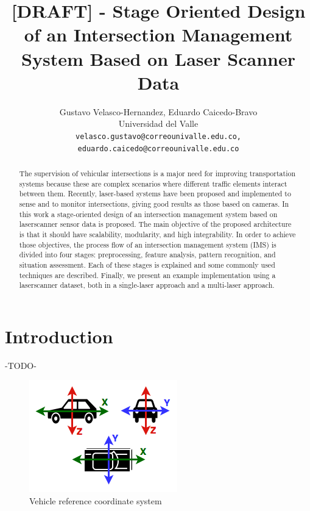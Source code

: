 \documentclass[10pt,twocolumn,letterpaper]{article}
\begin{document}
\title{[DRAFT] - Stage Oriented Design of an Intersection Management System Based on Laser Scanner Data}

\author{Gustavo Velasco-Hernandez, Eduardo Caicedo-Bravo \\
Universidad del Valle\\
{\tt\small velasco.gustavo@correounivalle.edu.co, eduardo.caicedo@correounivalle.edu.co}
}

\maketitle

\begin{abstract}
The supervision of vehicular intersections is a major need for improving transportation systems because these are complex scenarios where different traffic elements interact between them. Recently, laser-based systems have been proposed and implemented to sense and to monitor intersections, giving good results as those based on cameras. In this work a stage-oriented design of an intersection management system based on laserscanner sensor data is proposed. The main objective of the proposed architecture is that it should have scalability, modularity, and high integrability. In order to achieve those objectives, the process flow of an intersection management system (IMS) is divided into four stages: preprocessing, feature analysis, pattern recognition, and situation assessment. Each of these stages is explained and some commonly used techniques are described. Finally, we present an example implementation using a laserscanner dataset, both in a single-laser approach and a multi-laser approach.


\end{abstract}
 

\section{Introduction}

-TODO-

\begin{figure}[ht!]
\centering
\includegraphics[scale=0.85]{fig/carReferenceSystem.png}
\caption{Vehicle reference coordinate system}
\label{vehicle_cs}
\end{figure}
\end{document}
